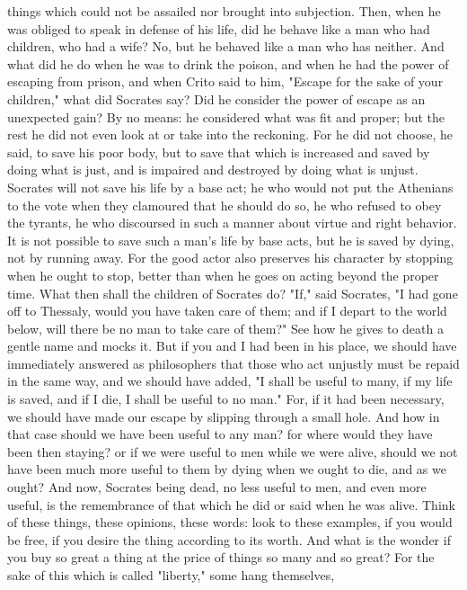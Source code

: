 \documentclass[a4paper]{article}
\begin{document}
things which could not be assailed nor brought into subjection. Then, when he
was obliged to speak in defense of his life, did he behave like a man who had
children, who had a wife? No, but he behaved like a man who has neither. And
what did he do when he was to drink the poison, and when he had the power of
escaping from prison, and when Crito said to him, "Escape for the sake of your
children," what did Socrates say? Did he consider the power of escape as an
unexpected gain? By no means: he considered what was fit and proper; but the
rest he did not even look at or take into the reckoning. For he did not choose,
he said, to save his poor body, but to save that which is increased and saved
by doing what is just, and is impaired and destroyed by doing what is unjust.
Socrates will not save his life by a base act; he who would not put the
Athenians to the vote when they clamoured that he should do so, he who refused
to obey the tyrants, he who discoursed in such a manner about virtue and right
behavior. It is not possible to save such a man's life by base acts, but he is
saved by dying, not by running away. For the good actor also preserves his
character by stopping when he ought to stop, better than when he goes on acting
beyond the proper time. What then shall the children of Socrates do? "If," said
Socrates, "I had gone off to Thessaly, would you have taken care of them; and
if I depart to the world below, will there be no man to take care of them?" See
how he gives to death a gentle name and mocks it. But if you and I had been in
his place, we should have immediately answered as philosophers that those who
act unjustly must be repaid in the same way, and we should have added, "I shall
be useful to many, if my life is saved, and if I die, I shall be useful to no
man." For, if it had been necessary, we should have made our escape by slipping
through a small hole. And how in that case should we have been useful to any
man? for where would they have been then staying? or if we were useful to men
while we were alive, should we not have been much more useful to them by dying
when we ought to die, and as we ought? And now, Socrates being dead, no less
useful to men, and even more useful, is the remembrance of that which he did or
said when he was alive.
    Think of these things, these opinions, these words: look to these examples,
if you would be free, if you desire the thing according to its worth. And what
is the wonder if you buy so great a thing at the price of things so many and so
great? For the sake of this which is called "liberty," some hang themselves,
\end{document}
